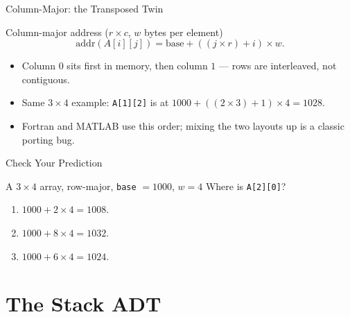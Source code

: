 \documentclass[aspectratio=169]{beamer}
\begin{document}
\begin{frame}{Column-Major: the Transposed Twin}
  \begin{block}{Column-major address ($r \times c$, $w$ bytes per element)}
    \[ \text{addr}(A[i][j]) = \text{base} + ((j \times r) + i) \times w. \]
  \end{block}
  \begin{itemize}
    \item Column $0$ sits first in memory, then column $1$ --- rows are
      interleaved, not contiguous.
    \item Same $3 \times 4$ example: \texttt{A[1][2]} is at
      $1000 + ((2 \times 3) + 1) \times 4 = 1028$.
    \item Fortran and MATLAB use this order; mixing the two layouts up is a
      classic porting bug.
  \end{itemize}
\end{frame}

\begin{frame}{Check Your Prediction}
  \begin{block}{A $3 \times 4$ array, row-major, \texttt{base} $= 1000$, $w = 4$}
    Where is \texttt{A[2][0]}?
  \end{block}
  \begin{enumerate}
    \item $1000 + 2 \times 4 = 1008$.
    \item $1000 + 8 \times 4 = 1032$.
    \item $1000 + 6 \times 4 = 1024$.
  \end{enumerate}
\end{frame}


\section{The Stack ADT}

\end{document}
